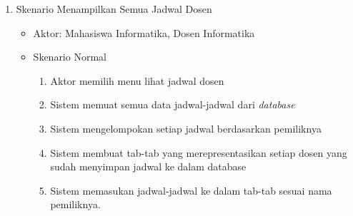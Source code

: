 \begin{enumerate}
	\item Skenario Menampilkan Semua Jadwal Dosen
	\begin{itemize}
		\item Aktor: Mahasiswa Informatika, Dosen Informatika
		\item Skenario Normal
			\begin{enumerate}[1.]
				\item Aktor memilih menu lihat jadwal dosen
				\item Sistem memuat semua data jadwal-jadwal dari \textit{database}
				\item Sistem mengelompokan setiap jadwal berdasarkan pemiliknya
				\item Sistem membuat tab-tab yang merepresentasikan setiap dosen yang sudah menyimpan jadwal ke dalam database
				\item Sistem memasukan jadwal-jadwal ke dalam tab-tab sesuai nama pemiliknya.
			\end{enumerate}
	\end{itemize}
	


\end{enumerate}
